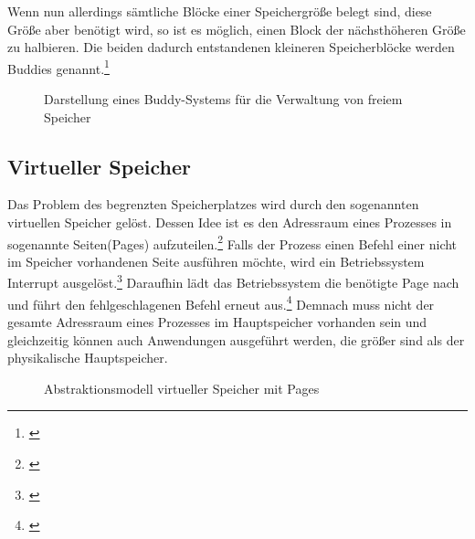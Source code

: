 Wenn nun allerdings sämtliche Blöcke einer Speichergröße belegt sind, diese Größe aber benötigt wird, so ist es möglich, einen Block der nächsthöheren Größe zu halbieren. Die beiden dadurch entstandenen kleineren Speicherblöcke werden Buddies genannt.\footnote{\cite[S.~126]{Brause.2017}}

\begin{figure}[htb]
	\centering
	\caption{Darstellung eines Buddy-Systems für die Verwaltung von freiem Speicher}
\end{figure}

\subsection{Virtueller Speicher}
\label{subsec:VirtuelleAdressraeume}
Das Problem des begrenzten Speicherplatzes wird durch den sogenannten virtuellen Speicher gelöst. Dessen Idee ist es den Adressraum eines Prozesses in sogenannte Seiten(Pages) aufzuteilen.\footnote{\cite[S.~252]{Tanenbaum.2016}} Falls der Prozess einen Befehl einer nicht im Speicher vorhandenen Seite ausführen möchte, wird ein Betriebssystem Interrupt ausgelöst.\footnote{\cite[S.~252]{Tanenbaum.2016}} Daraufhin lädt das Betriebssystem die benötigte Page nach und führt den fehlgeschlagenen Befehl erneut aus.\footnote{\cite[S.~252]{Tanenbaum.2016}} Demnach muss nicht der gesamte Adressraum eines Prozesses im Hauptspeicher vorhanden sein und gleichzeitig können auch Anwendungen ausgeführt werden, die größer sind als der physikalische Hauptspeicher.

\begin{figure}[htb]
	\centering
	\caption{Abstraktionsmodell virtueller Speicher mit Pages}
\end{figure}

